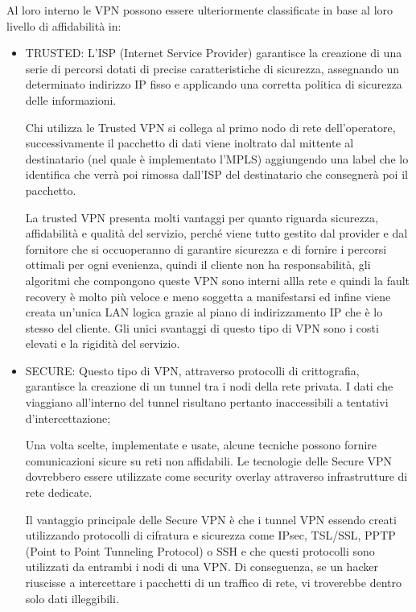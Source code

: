 Al loro interno le VPN possono essere ulteriormente classificate in base al loro livello di affidabilità in:

\begin{itemize}
    \item TRUSTED: L’ISP (Internet Service Provider) garantisce la creazione di una serie di percorsi dotati di precise caratteristiche di sicurezza, assegnando un determinato indirizzo IP fisso e applicando una corretta politica di sicurezza delle informazioni.
    
    Chi utilizza le Trusted VPN si collega al primo nodo di rete dell’operatore, successivamente il pacchetto di dati viene inoltrato dal mittente al destinatario (nel quale è implementato l’MPLS) aggiungendo una label che lo identifica che verrà poi rimossa dall’ISP del destinatario che consegnerà poi il pacchetto.

    La trusted VPN presenta molti vantaggi per quanto riguarda sicurezza, affidabilità e qualità del servizio, perché viene tutto gestito dal provider e dal fornitore che si occuoperanno di garantire sicurezza e di fornire i percorsi ottimali per ogni evenienza, quindi il cliente non ha responsabilità, gli algoritmi che compongono queste VPN sono interni allla rete e quindi la fault recovery è molto più veloce e meno soggetta a manifestarsi ed infine viene creata un’unica LAN logica grazie al piano di indirizzamento IP che è lo stesso del cliente. Gli unici svantaggi di questo tipo di VPN sono i costi elevati e la rigidità del servizio.

    \item SECURE: Questo tipo di VPN, attraverso protocolli di crittografia, garantisce la creazione di un tunnel tra i nodi della rete privata. I dati che viaggiano all’interno del tunnel risultano pertanto inaccessibili a tentativi d’intercettazione;
    
    Una volta scelte, implementate e usate, alcune tecniche possono fornire comunicazioni sicure su reti non affidabili. Le tecnologie delle Secure VPN dovrebbero essere utilizzate come security overlay attraverso infrastrutture di rete dedicate.

    Il vantaggio principale delle Secure VPN è che i tunnel VPN essendo creati utilizzando protocolli di cifratura e sicurezza come IPsec, TSL/SSL, PPTP (Point to Point Tunneling Protocol) o SSH e che questi protocolli sono utilizzati da entrambi i nodi di una VPN. Di conseguenza, se un hacker riuscisse a intercettare i pacchetti di un traffico di rete, vi troverebbe dentro solo dati illeggibili.


\end{itemize}
